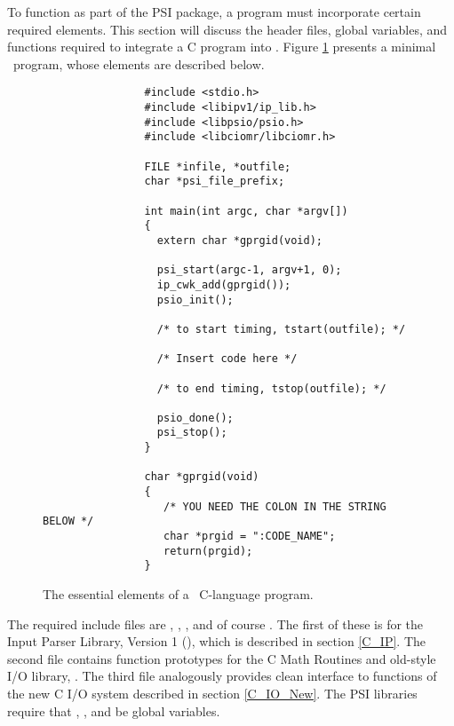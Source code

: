 %
%
%
%

To function as part of the PSI package, a program must incorporate
certain required elements.  This section will discuss the header
files, global variables, and functions required to integrate a C
program into \PSIthree.  Figure \ref{fig:Essential_C_Program} presents
a minimal \PSIthree\ program, whose elements are described below.

\begin{figure}
\begin{verbatim}
                #include <stdio.h>
                #include <libipv1/ip_lib.h>
                #include <libpsio/psio.h>
                #include <libciomr/libciomr.h>

                FILE *infile, *outfile;
                char *psi_file_prefix;

                int main(int argc, char *argv[])
                {
                  extern char *gprgid(void);

                  psi_start(argc-1, argv+1, 0);
                  ip_cwk_add(gprgid());
                  psio_init();

                  /* to start timing, tstart(outfile); */
                
                  /* Insert code here */

                  /* to end timing, tstop(outfile); */

                  psio_done();
                  psi_stop();
                }

                char *gprgid(void)
                {
                   /* YOU NEED THE COLON IN THE STRING BELOW */
                   char *prgid = ":CODE_NAME";
                   return(prgid);
                }               
\end{verbatim}
\caption{The essential elements of a \PSIthree\ C-language program.}
\label{fig:Essential_C_Program}
\end{figure}

The required include files are ,
, , and of course
.  The first of these is for the Input Parser Library,
Version 1 (), which is described in section
\ref{C_IP}.  The second file contains function prototypes for the C
Math Routines and old-style I/O library, .  The third
file analogously provides clean interface to functions of the new C
I/O system described in section \ref{C_IO_New}.  The PSI libraries
require that , , and
 be global variables.  


